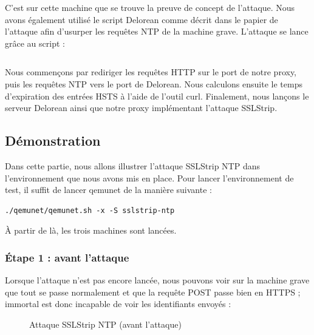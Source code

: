 C'est sur cette machine que se trouve la preuve de concept de l'attaque. Nous avons également utilisé le script Delorean \cite{delorean} comme décrit dans le papier de l'attaque afin d'usurper les requêtes NTP de la machine grave. L'attaque se lance grâce au script  :

\inputminted[bgcolor=lbcolor, breaklines]{bash}{../sslstrip-ntp/immortal/attack.sh}

Nous commençons par rediriger les requêtes HTTP sur le port de notre proxy, puis les requêtes NTP vers le port de Delorean. Nous calculons ensuite le temps d'expiration des entrées HSTS à l'aide de l'outil curl. Finalement, nous lançons le serveur Delorean ainsi que notre proxy implémentant l'attaque SSLStrip.

\subsection{Démonstration}

Dans cette partie, nous allons illustrer l'attaque SSLStrip NTP dans l'environnement que nous avons mis en place. Pour lancer l'environnement de test, il suffit de lancer qemunet de la manière suivante :

\begin{verbatim}
./qemunet/qemunet.sh -x -S sslstrip-ntp
\end{verbatim}

À partir de là, les trois machines sont lancées.

\subsubsection{Étape 1 : avant l'attaque}

Lorsque l'attaque n'est pas encore lancée, nous pouvons voir sur la machine grave que tout se passe normalement et que la requête POST passe bien en HTTPS ; immortal est donc incapable de voir les identifiants envoyés :

\begin{figure}[H]
  \caption{Attaque SSLStrip NTP (avant l'attaque)}
\end{figure}


